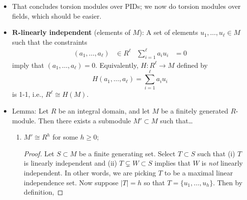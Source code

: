 \documentclass[../notes.tex]{subfiles}
\begin{document}
\begin{itemize}
    \begin{proof}[Proof of theorem]
        Let $p_1,\dots,p_\ell$ be ?? the set of primes for which $M_{(p)}\neq 0$. Let
        \begin{equation*}
            M_{(p_i)} \cong R/(p_i^{m_i,1})\times R/(p_i^{m_i,2})\times\cdots
        \end{equation*}
        where $m_{i,1}\geq m_{i,2}\geq\cdots$. are such that there exists $N$ for which $m_{i,N}=0$. Then
        \begin{equation*}
            M/(p_j) \cong R/(p_j^{m_j,1})^\times\times R/(p_j^{m_j,2})^\times
        \end{equation*}
        Then we apply the Chinese Remainder Theorem. Define
        \begin{equation*}
            a_r = \prod_{i=1}^\ell p_i^{m_i,r}
        \end{equation*}
        where $a_{r+1}\mid a_r$ because $m_{i,j}$ is ?? in $j$. Use the CRT to imply that
        \begin{equation*}
            \prod_{i=1}^\ell R/(p_i^{m_i,r}) \cong R/(a_r)
        \end{equation*}
    \end{proof}
    \item That concludes torsion modules over PIDs; we now do torsion modules over fields, which should be easier.
    \item \textbf{$\bm{R}$-linearly independent} (elements of $M$): A set of elements $u_1,\dots,u_\ell\in M$ such that the constraints
    \begin{align*}
        (a_1,\dots,a_\ell) &\in R^\ell&
        \sum_{i=1}^\ell a_iu_i &= 0
    \end{align*}
    imply that $(a_1,\dots,a_\ell)=0$. Equivalently, $H:R^\ell\to M$ defined by
    \begin{equation*}
        H(a_1,\dots,a_\ell) = \sum_{i=1}^\ell a_iu_i
    \end{equation*}
    is 1-1, i.e., $R^\ell\cong H(M)$.
    \item Lemma: Let $R$ be an integral domain, and let $M$ be a finitely generated $R$-module. Then there exists a submodule $M'\subset M$ such that\dots
    \begin{enumerate}[label={(\roman*)}]
        \item $M'\cong R^h$ for some $h\geq 0$;
        \begin{proof}
            Let $S\subset M$ be a finite generating set. Select $T\subset S$ such that (i) $T$ is linearly independent and (ii) $T\subsetneq W\subset S$ implies that $W$ is \emph{not} linearly independent. In other words, we are picking $T$ to be a maximal linear independence set. Now suppose $|T|=h$ so that $T=\{u_1,\dots,u_h\}$. Then by definition,

\end{proof}
\end{enumerate}
\end{itemize}
\end{document}
